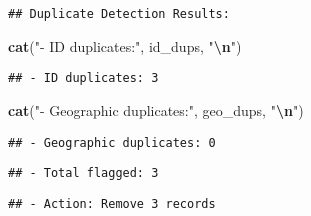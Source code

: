 \documentclass[
]{article}
\newenvironment{Shaded}{\begin{snugshade}}{\end{snugshade}}
\newcommand{\FunctionTok}[1]{\textcolor[rgb]{0.13,0.29,0.53}{\textbf{#1}}}
\newcommand{\NormalTok}[1]{#1}
\newcommand{\SpecialCharTok}[1]{\textcolor[rgb]{0.81,0.36,0.00}{\textbf{#1}}}
\newcommand{\StringTok}[1]{\textcolor[rgb]{0.31,0.60,0.02}{#1}}
\begin{document}
\begin{verbatim}
## Duplicate Detection Results:
\end{verbatim}

\begin{Shaded}
\begin{Highlighting}[]
\FunctionTok{cat}\NormalTok{(}\StringTok{"{-} ID duplicates:"}\NormalTok{, id\_dups, }\StringTok{"}\SpecialCharTok{\textbackslash{}n}\StringTok{"}\NormalTok{)}
\end{Highlighting}
\end{Shaded}

\begin{verbatim}
## - ID duplicates: 3
\end{verbatim}

\begin{Shaded}
\begin{Highlighting}[]
\FunctionTok{cat}\NormalTok{(}\StringTok{"{-} Geographic duplicates:"}\NormalTok{, geo\_dups, }\StringTok{"}\SpecialCharTok{\textbackslash{}n}\StringTok{"}\NormalTok{)}
\end{Highlighting}
\end{Shaded}

\begin{verbatim}
## - Geographic duplicates: 0
\end{verbatim}

\begin{Shaded}
\end{Shaded}

\begin{verbatim}
## - Total flagged: 3
\end{verbatim}

\begin{Shaded}
\end{Shaded}

\begin{verbatim}
## - Action: Remove 3 records
\end{verbatim}
\end{document}
